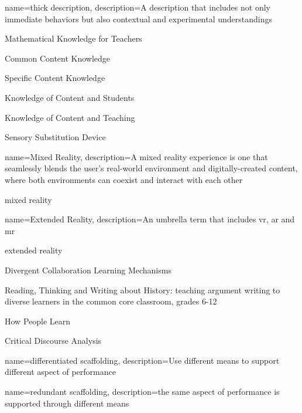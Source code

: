 {
	name={thick description},
	description={A description that includes not only immediate behaviors but also contextual and experimental understandings}
}


{Mathematical Knowledge for Teachers}

{Common Content Knowledge}

{Specific Content Knowledge}

{Knowledge of Content and Students}

{Knowledge of Content and Teaching}


{Sensory Substitution Device}


{
	name={Mixed Reality},
	description={A mixed reality experience is one that seamlessly blends the user’s real-world environment and digitally-created content, where both environments can coexist and interact with each other \parencite{noauthor_what_2019}}
}

{\gls{mixed reality}}


{
	name={Extended Reality},
	description={An umbrella term that includes \acrlong{vr}, \acrlong{ar} and \acrlong{mr}}
}

{\gls{extended reality}}

{Divergent Collaboration Learning Mechanisms}

{Reading, Thinking and Writing about History: teaching argument writing to diverse learners in the common core classroom, grades 6-12}

{How People Learn}

{Critical Discourse Analysis}

{
	name={differentiated scaffolding},
	description={Use different means to support different aspect of performance}
}

{
	name={redundant scaffolding},
	description={the same aspect of performance is supported through different means}
}

